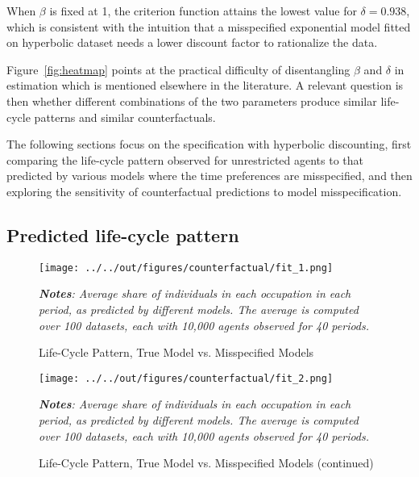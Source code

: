 When $\beta$ is fixed at 1, the criterion function attains the lowest value for $\delta = 0.938$, which is consistent with the intuition that a misspecified exponential model fitted on hyperbolic dataset needs a lower discount factor to rationalize the data. 

Figure~\ref{fig:heatmap} points at the practical difficulty of disentangling $\beta$ and $\delta$ in estimation which is mentioned elsewhere in the literature. A relevant question is then whether different combinations of the two parameters produce similar life-cycle patterns and similar counterfactuals.

The following sections focus on the specification with hyperbolic discounting, first comparing the life-cycle pattern observed for unrestricted agents to that predicted by various models where the time preferences are misspecified, and then exploring the sensitivity of counterfactual predictions to model misspecification. 

\subsection{Predicted life-cycle pattern}

\begin{figure}[!t]
\centering
\captionsetup{justification=centering}
\caption{Life-Cycle Pattern, True Model vs. Misspecified Models}
\label{fig:model-fit-1}
\texttt{[image: ../../out/figures/counterfactual/fit\_1.png]}

\bigskip
\footnotesize
\raggedright
\textit{\textbf{Notes}: Average share of individuals in each occupation in each period, as predicted by different models. The average is computed over 100 datasets, each with 10,000 agents observed for 40 periods.}
\end{figure}

\begin{figure}[!t]
\ContinuedFloat
\centering
\captionsetup{justification=centering}
\caption{Life-Cycle Pattern, True Model vs. Misspecified Models (continued)}
\label{fig:model-fit-2}
\texttt{[image: ../../out/figures/counterfactual/fit\_2.png]}

\bigskip
\footnotesize
\raggedright
\textit{\textbf{Notes}: Average share of individuals in each occupation in each period, as predicted by different models. The average is computed over 100 datasets, each with 10,000 agents observed for 40 periods.}
\end{figure} 

